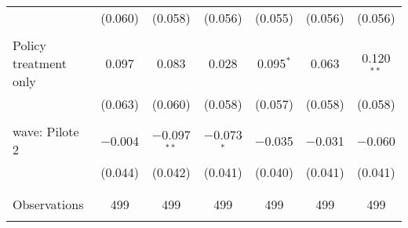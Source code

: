 \begin{tabular}{@{\extracolsep{5pt}}lcccccc}
  & (0.060) & (0.058) & (0.056) & (0.055) & (0.056) & (0.056) \\ 
  & & & & & & \\ 
 Policy treatment only & 0.097 & 0.083 & 0.028 & 0.095$^{*}$ & 0.063 & 0.120$^{**}$ \\ 
  & (0.063) & (0.060) & (0.058) & (0.057) & (0.058) & (0.058) \\ 
  & & & & & & \\ 
 wave: Pilote 2 & $-$0.004 & $-$0.097$^{**}$ & $-$0.073$^{*}$ & $-$0.035 & $-$0.031 & $-$0.060 \\ 
  & (0.044) & (0.042) & (0.041) & (0.040) & (0.041) & (0.041) \\ 
  & & & & & & \\ 
\hline \\[-1.8ex] 

Observations & 499 & 499 & 499 & 499 & 499 & 499 \\ 
\hline 
\hline \\[-1.8ex] 
\end{tabular} 